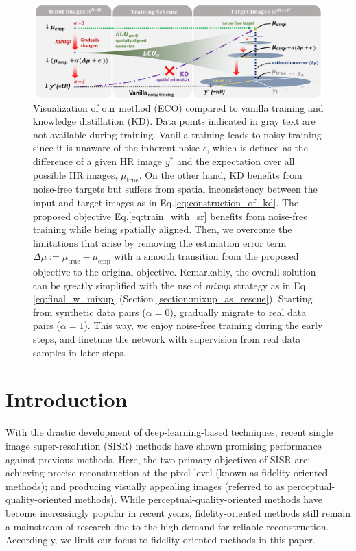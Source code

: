\documentclass[letterpaper]{article} %
\begin{document}
\begin{figure}[t]
    \begin{center}
    \includegraphics[width=\textwidth]{figures/main_figure.pdf}
    \end{center}
    \caption{
    Visualization of our method (ECO) compared to vanilla training and knowledge distillation (KD). Data points indicated in gray text are not available during training.
    Vanilla training leads to noisy training since it is unaware of the inherent noise $\epsilon$, which is defined as the difference of a given HR image $y^*$ and the expectation over all possible HR images, $\mu_{\text{true}}$. On the other hand, KD benefits from noise-free targets but suffers from spatial inconsistency between the input and target images as in Eq.\eqref{eq:construction_of_kd}.
    The proposed objective Eq.\eqref{eq:train_with_sr} benefits from noise-free training while being spatially aligned. Then, we overcome the limitations that arise by removing the estimation error term $\Delta\mu:=\mu_\text{true}-\mu_\text{emp}$ with a smooth transition from the proposed objective to the original objective. Remarkably, the overall solution can be greatly simplified with the use of \textit{mixup} strategy as in Eq.\eqref{eq:final_w_mixup} (Section \ref{section:mixup_as_rescue}).
    Starting from synthetic data pairs ($\alpha=0$), gradually migrate to real data pairs ($\alpha=1$). This way, we enjoy noise-free training during the early steps, and finetune the network with supervision from real data samples in later steps.
    }
    \label{fig:main_figure}
\end{figure}

\section{Introduction}
With the drastic development of deep-learning-based techniques, recent single image super-resolution (SISR) methods have shown promising performance against previous methods. Here, the two primary objectives of SISR are; achieving precise reconstruction at the pixel level (known as fidelity-oriented methods); and producing visually appealing \cite{niqe, lpips} images (referred to as perceptual-quality-oriented methods). While perceptual-quality-oriented methods have become increasingly popular in recent years, fidelity-oriented methods still remain a mainstream of research due to the high demand for reliable reconstruction. Accordingly, we limit our focus to fidelity-oriented methods in this paper.
\end{document}
